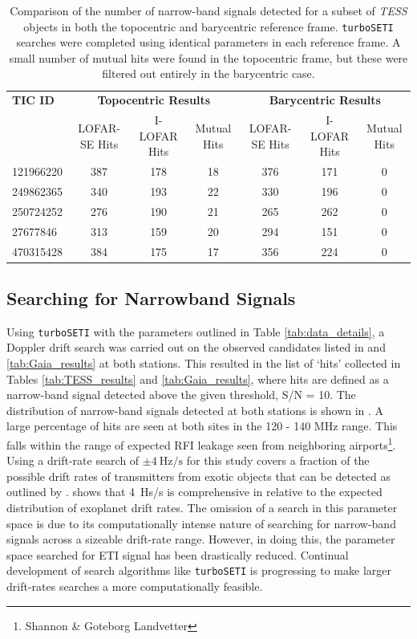 \begin{table}[ht]
  \centering
  \begin{tabular}{lccc|ccc}
  \hline
  \textbf{TIC ID} & \multicolumn{3}{c|}{\textbf{Topocentric Results}} & \multicolumn{3}{c}{\textbf{Barycentric Results}} \\
   & LOFAR-SE Hits & I-LOFAR Hits & Mutual Hits & LOFAR-SE Hits & I-LOFAR Hits & Mutual Hits \\
  \hline
  121966220 & 387 & 178 & 18 & 376 & 171 & 0 \\
  249862365 & 340 & 193 & 22 & 330 & 196 & 0 \\
  250724252 & 276 & 190 & 21 & 265 & 262 & 0 \\
  27677846  & 313 & 159 & 20 & 294 & 151 & 0 \\
  470315428 & 384 & 175 & 17 & 356 & 224 & 0 \\
  \hline
  \end{tabular}
  \caption{Comparison of the number of narrow-band signals detected for a subset of \textit{TESS} objects in both the topocentric and barycentric reference frame. \texttt{turboSETI} searches were completed using identical parameters in each reference frame. A small number of mutual hits were found in the topocentric frame, but these were filtered out entirely in the barycentric case.}
  \label{tab:narrowband_hit_bary_non_bary_compare}
  \end{table}
  

\subsection{Searching for Narrowband Signals}
Using \verb|turboSETI| with the parameters outlined in Table \ref{tab:data_details}, a Doppler drift search was carried out on the observed candidates listed in  and \ref{tab:Gaia_results} at both stations. This resulted in the list of `hits' collected in Tables \ref{tab:TESS_results} and \ref{tab:Gaia_results}, where hits are defined as a narrow-band signal detected above the given threshold, S/N = 10. The distribution of narrow-band signals detected at both stations is shown in . A large percentage of hits are seen at both sites in the 120 - 140 MHz range. This falls within the range of expected RFI leakage seen from neighboring airports\footnote{Shannon \& Goteborg Landvetter}. \\

Using a drift-rate search of $\pm 4 \ \text{Hz/s}$ for this study covers a fraction of the possible drift rates of transmitters from exotic objects that can be detected as outlined by \cite{Sheikh_2019}. \cite{LiNarrowBand} shows that 4~Hs/s is comprehensive in relative to the expected distribution of exoplanet drift rates. The omission of a search in this parameter space is due to its computationally intense nature of searching for narrow-band signals across a sizeable drift-rate range. However, in doing this, the parameter space searched for ETI signal has been drastically reduced. Continual development of search algorithms like \verb|turboSETI| is progressing to make larger drift-rates searches a more computationally feasible. \\ 

